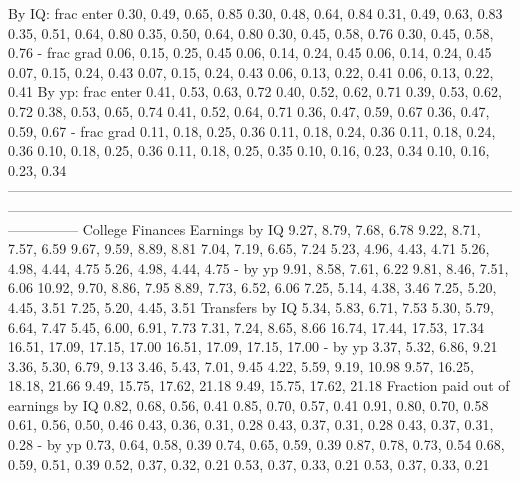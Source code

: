                      By IQ: frac enter       0.30, 0.49, 0.65, 0.85       0.30, 0.48, 0.64, 0.84   0.31, 0.49, 0.63, 0.83    0.35, 0.51, 0.64, 0.80      0.35, 0.50, 0.64, 0.80      0.30, 0.45, 0.58, 0.76      0.30, 0.45, 0.58, 0.76
                           - frac grad       0.06, 0.15, 0.25, 0.45       0.06, 0.14, 0.24, 0.45   0.06, 0.14, 0.24, 0.45    0.07, 0.15, 0.24, 0.43      0.07, 0.15, 0.24, 0.43      0.06, 0.13, 0.22, 0.41      0.06, 0.13, 0.22, 0.41
                     By yp: frac enter       0.41, 0.53, 0.63, 0.72       0.40, 0.52, 0.62, 0.71   0.39, 0.53, 0.62, 0.72    0.38, 0.53, 0.65, 0.74      0.41, 0.52, 0.64, 0.71      0.36, 0.47, 0.59, 0.67      0.36, 0.47, 0.59, 0.67
                           - frac grad       0.11, 0.18, 0.25, 0.36       0.11, 0.18, 0.24, 0.36   0.11, 0.18, 0.24, 0.36    0.10, 0.18, 0.25, 0.36      0.11, 0.18, 0.25, 0.35      0.10, 0.16, 0.23, 0.34      0.10, 0.16, 0.23, 0.34
---------------------------------------------------------------------------------------------------------------------------------------------------------------------------------------------------------------------------------------
                      College Finances                                                                                                                                                                                                 
                        Earnings by IQ       9.27, 8.79, 7.68, 6.78       9.22, 8.71, 7.57, 6.59   9.67, 9.59, 8.89, 8.81    7.04, 7.19, 6.65, 7.24      5.23, 4.96, 4.43, 4.71      5.26, 4.98, 4.44, 4.75      5.26, 4.98, 4.44, 4.75
                               - by yp       9.91, 8.58, 7.61, 6.22       9.81, 8.46, 7.51, 6.06  10.92, 9.70, 8.86, 7.95    8.89, 7.73, 6.52, 6.06      7.25, 5.14, 4.38, 3.46      7.25, 5.20, 4.45, 3.51      7.25, 5.20, 4.45, 3.51
                       Transfers by IQ       5.34, 5.83, 6.71, 7.53       5.30, 5.79, 6.64, 7.47   5.45, 6.00, 6.91, 7.73    7.31, 7.24, 8.65, 8.66  16.74, 17.44, 17.53, 17.34  16.51, 17.09, 17.15, 17.00  16.51, 17.09, 17.15, 17.00
                               - by yp       3.37, 5.32, 6.86, 9.21       3.36, 5.30, 6.79, 9.13   3.46, 5.43, 7.01, 9.45   4.22, 5.59, 9.19, 10.98   9.57, 16.25, 18.18, 21.66   9.49, 15.75, 17.62, 21.18   9.49, 15.75, 17.62, 21.18
   Fraction paid out of earnings by IQ       0.82, 0.68, 0.56, 0.41       0.85, 0.70, 0.57, 0.41   0.91, 0.80, 0.70, 0.58    0.61, 0.56, 0.50, 0.46      0.43, 0.36, 0.31, 0.28      0.43, 0.37, 0.31, 0.28      0.43, 0.37, 0.31, 0.28
                               - by yp       0.73, 0.64, 0.58, 0.39       0.74, 0.65, 0.59, 0.39   0.87, 0.78, 0.73, 0.54    0.68, 0.59, 0.51, 0.39      0.52, 0.37, 0.32, 0.21      0.53, 0.37, 0.33, 0.21      0.53, 0.37, 0.33, 0.21
